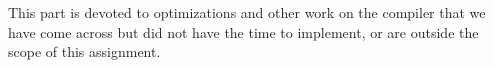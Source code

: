 
This part is devoted to optimizations and other work on the compiler that we have come across but did not have the time to implement, or are outside the scope of this assignment.  




